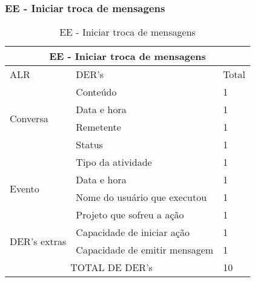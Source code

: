 \subsubsection{EE - Iniciar troca de mensagens}
\begin{table}[!h]
\centering
\caption{EE - Iniciar troca de mensagens}
\label{ee_iniciar_troca}
\begin{tabular}{|l|l|l|}
\hline
\multicolumn{3}{|c|}{EE - Iniciar troca de mensagens}                 \\ \hline
ALR                           & DER's                         & Total \\ \hline
\multirow{4}{*}{Conversa}     & Conteúdo                      & 1     \\ \cline{2-3} 
                              & Data e hora                   & 1     \\ \cline{2-3} 
                              & Remetente                     & 1     \\ \cline{2-3} 
                              & Status                        & 1     \\ \hline
\multirow{4}{*}{Evento}       & Tipo da atividade             & 1     \\ \cline{2-3} 
                              & Data e hora                   & 1     \\ \cline{2-3} 
                              & Nome do usuário que executou  & 1     \\ \cline{2-3} 
                              & Projeto que sofreu a ação     & 1     \\ \hline
\multirow{2}{*}{DER's extras} & Capacidade de iniciar ação    & 1     \\ \cline{2-3} 
                              & Capacidade de emitir mensagem & 1     \\ \hline
\multicolumn{2}{|c|}{TOTAL DE DER's}                          & 10    \\ \hline
\end{tabular}
\end{table}
  
 
\vfill
\pagebreak
